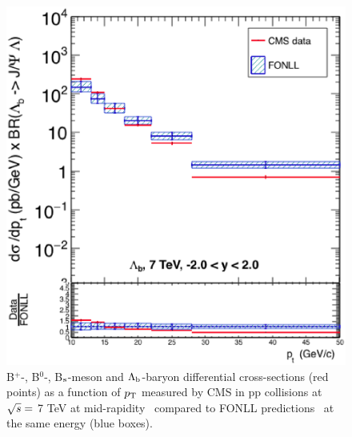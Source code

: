 \begin{figure}[!htbp]
\begin{center}
\includegraphics[width=.45\textwidth]{FigCap4/Lambdab_7TeV_y_20_20.eps}
\caption{B$^{+}$-, B$^{0}$-, B$_{\rm s}$-meson and $\Lambda_{\rm b}$-baryon differential cross-sections (red points) as a function of $p_{\rm T}$ measured by CMS in pp collisions at $\sqrt{s} =$ 7 TeV at mid-rapidity~\cite{Khachatryan:2011mk,Chatrchyan:2011pw,Chatrchyan:2011vh,Chatrchyan:2012xg} compared to FONLL predictions~\cite{Cacciari:1998it, Cacciari:2001td} at the same energy (blue boxes). }
\label{fig:Bmesons}
\end{center}
\end{figure}
